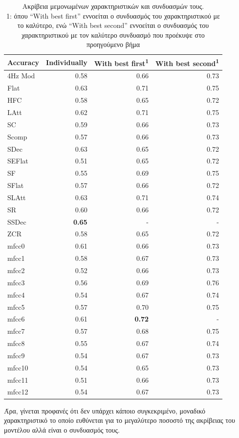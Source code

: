 \begin{table}[H]
	\centering
	\begin{tabular}{@{} l r r r @{}}
		\toprule
		\textbf{Accuracy} & \textbf{Individually} & \textbf{With best first\textsuperscript{1}} & \textbf{With best second\textsuperscript{1}} \\ \midrule
		4Hz Mod & 0.58 & 0.66 & 0.73 \\
		Flat & 0.63 & 0.71 & 0.75 \\
		HFC & 0.58 & 0.65 & 0.72 \\ \midrule
		LAtt & 0.62 & 0.71 & 0.75 \\
		SC & 0.59 & 0.66 & 0.73 \\
		Scomp & 0.57 & 0.66 & 0.73 \\ \midrule
		SDec & 0.63 & 0.65 & 0.72 \\
		SEFlat & 0.51 & 0.65 & 0.72 \\
		SF & 0.55 & 0.69 & 0.75 \\ \midrule
		SFlat & 0.57 & 0.66 & 0.72 \\
		SLAtt & 0.63 & 0.71 & 0.74 \\
		SR & 0.60 & 0.66 & 0.72 \\ \midrule
		SSDec & \textbf{0.65} & - & - \\
		ZCR & 0.58 & 0.65 & 0.72 \\
		mfcc0 & 0.61 & 0.66 & 0.73 \\ \midrule
		mfcc1 & 0.58 & 0.67 & 0.73 \\
		mfcc2 & 0.52 & 0.66 & 0.73 \\
		mfcc3 & 0.56 & 0.69 & 0.76 \\ \midrule
		mfcc4 & 0.54 & 0.67 & 0.74 \\
		mfcc5 & 0.57 & 0.70 & 0.75 \\
		mfcc6 & 0.61 & \textbf{0.72} & - \\ \midrule
		mfcc7 & 0.57 & 0.68 & 0.75 \\
		mfcc8 & 0.55 & 0.67 & 0.74 \\
		mfcc9 & 0.54 & 0.67 & 0.73 \\ \midrule
		mfcc10 & 0.54 & 0.65 & 0.73 \\
		mfcc11 & 0.51 & 0.66 & 0.73 \\
		mfcc12 & 0.54 & 0.67 & 0.73 \\ \bottomrule
	\end{tabular}
	\caption{Ακρίβεια μεμονωμένων χαρακτηριστικών και συνδυασμών τους. \vspace{1em}\\\tiny
	1: όπου ``With best first'' εννοείται ο συνδυασμός του χαρακτηριστικού με το καλύτερο, ενώ ``With best second'' εννοείται ο συνδυασμός του χαρακτηριστικού με τον καλύτερο συνδυασμό που προέκυψε στο προηγούμενο βήμα}
\end{table}

Άρα, γίνεται προφανές ότι δεν υπάρχει κάποιο συγκεκριμένο, μοναδικό χαρακτηριστικό το οποίο ευθύνεται για το μεγαλύτερο ποσοστό της ακρίβειας του μοντέλου αλλά είναι ο συνδυασμός τους.
